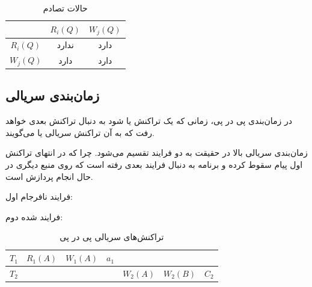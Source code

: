 \documentclass[a4paper]{article}
\begin{document}
\begin{LTR}
    \begin{table}[h]
        \centering
        \begin{RTL}
            \caption{حالات تصادم}
        \end{RTL}
        \begin{tabular}{|c|c|c|}
            \hline
            & $R_{i}(Q)$ & $W_{j}(Q)$ \\ \hline
            $R_{i}(Q)$ & ندارد &  دارد  \\ \hline
            $W_{j}(Q)$ & دارد & دارد  \\ \hline
        \end{tabular}
    \end{table}
\end{LTR}

\subsection{زمان‌بندی سریالی}

در زمان‌بندی پی در پی، زمانی که یک تراکنش  یا  شود به دنبال
تراکنش بعدی خواهد رفت که به آن تراکنش سریالی یا 
می‌گویند.

\begin{LTR}
\end{LTR}

زمان‌بندی سریالی بالا در حقیقت به دو فرایند تقسیم می‌شود. چرا که در انتهای
تراکنش اول پیام سقوط کرده و برنامه به دنبال فرایند بعدی رفته است که روی منبع
دیگری در حال انجام پردازش است.

فرایند نافرجام اول:

\begin{LTR}
\end{LTR}

فرایند  شده دوم:

\begin{LTR}
\end{LTR}

\begin{LTR}
    \begin{table}[h]
        \centering
        \begin{RTL}
            \caption{تراکنش‌های سریالی پی در پی}
        \end{RTL}
        \begin{tabular}{|c|c|c|c|c|c|c|}
            \hline
            $T_{1}$ & $R_{1}(A)$ & $W_{1}(A)$ & $a_{1}$ & & & \\ \hline
            $T_{2}$ & & & & $W_{2}(A)$ & $W_{2}(B)$ & $C_{2}$ \\ \hline
        \end{tabular}
    \end{table}
\end{LTR}
\end{document}
